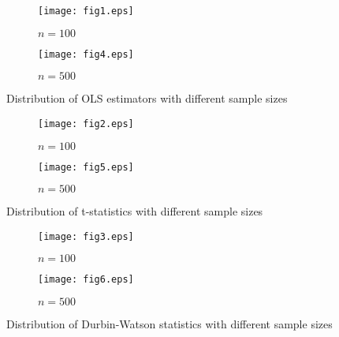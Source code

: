 \documentclass[]{article}
\begin{document}
\begin{figure}[h]
	\centering
	\begin{subfigure}{0.5\textwidth}
		\texttt{[image: fig1.eps]}
		\caption{$n = 100$}
		\label{fig:ols100}
	\end{subfigure}%
	\begin{subfigure}{0.5\textwidth}
		\texttt{[image: fig4.eps]}
		\caption{$n = 500$}
		\label{fig:ols500}
	\end{subfigure}
	\caption{Distribution of OLS estimators with different sample sizes}
	\label{fig:ols}
\end{figure}

\begin{figure}[h]
	\centering
	\begin{subfigure}{0.5\textwidth}
		\texttt{[image: fig2.eps]}
		\caption{$n = 100$}
		\label{fig:t100}
	\end{subfigure}%
	\begin{subfigure}{0.5\textwidth}
		\texttt{[image: fig5.eps]}
		\caption{$n = 500$}
		\label{fig:t500}
	\end{subfigure}
	\caption{Distribution of t-statistics with different sample sizes}
	\label{fig:t}
\end{figure}

\begin{figure}[h]
	\centering
	\begin{subfigure}{0.5\textwidth}
		\texttt{[image: fig3.eps]}
		\caption{$n = 100$}
		\label{fig:dw100}
	\end{subfigure}%
	\begin{subfigure}{0.5\textwidth}
		\texttt{[image: fig6.eps]}
		\caption{$n = 500$}
		\label{fig:dw500}
	\end{subfigure}
	\caption{Distribution of Durbin-Watson statistics with different sample sizes}
	\label{fig:dw}
\end{figure}
\end{document}
